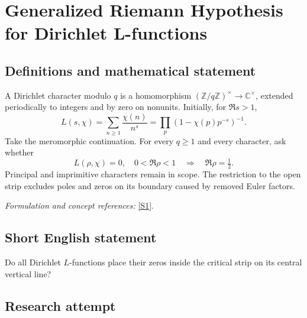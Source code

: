 \documentclass[11pt,a4paper]{article}
\newcommand{\Z}{\mathbb{Z}}
\newcommand{\C}{\mathbb{C}}
\newcommand{\sref}[2]{\hyperlink{source:#1:#2}{[S#2]}}
\newif\ifshowcatalogue
\newcommand{\cataloguescope}[1]{\ifshowcatalogue
 \paragraph{Exact scope in the supplied catalogue.}
 \begin{quote}\small #1\end{quote}\fi}
\begin{document}
\setcounter{section}{0}
\clearpage
\section*{\texorpdfstring{Generalized Riemann Hypothesis for Dirichlet L-functions}{Generalized Riemann Hypothesis for Dirichlet L-functions}}\label{30006676}
\subsection{Definitions and mathematical statement}
A Dirichlet character modulo $q$ is a homomorphism $(\Z/q\Z)^\times\to\C^\times$, extended periodically to integers and by zero on nonunits. Initially, for $\Re s>1$,
\[
 L(s,\chi)=\sum_{n\ge1}\frac{\chi(n)}{n^s}=\prod_p(1-\chi(p)p^{-s})^{-1}.
\]
Take the meromorphic continuation. For every $q\ge1$ and every character, ask whether
\[
 L(\rho,\chi)=0,\quad0<\Re\rho<1\quad\Longrightarrow\quad\Re\rho=\tfrac12.
\]
Principal and imprimitive characters remain in scope. The restriction to the open strip excludes poles and zeros on its boundary caused by removed Euler factors.
\par\smallskip\textit{Formulation and concept references:} \sref{30006676}{1}.
\cataloguescope{For every integer q>=1 and every Dirichlet character chi modulo q, including principal and imprimitive characters, every zero s of the meromorphic continuation of L(s,chi)=sum\_\{n>=1\}chi(n)n\textasciicircum{}(-s) in 0<Re(s)<1 satisfies Re(s)=1/2. The continuation is from Re(s)>1. Only open-strip zeros are quantified: principal-character poles and boundary zeros of imprimitive Euler factors are not counterexamples. No simplicity or central nonvanishing requirement is added.}
\subsection{Short English statement}
Do all Dirichlet $L$-functions place their zeros inside the critical strip on its central vertical line?
\subsection{Research attempt}
\end{document}
